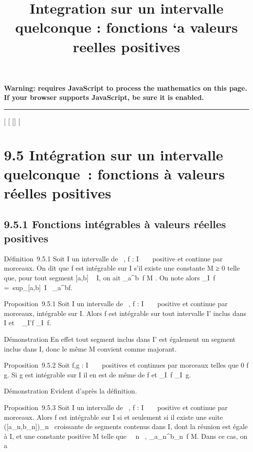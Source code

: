 \documentclass[]{article}
\title{Integration sur un intervalle quelconque : fonctions `a valeurs reelles
positives}
\author{}
\date{}
\begin{document}
\maketitle

\textbf{Warning: 
requires JavaScript to process the mathematics on this page.\\ If your
browser supports JavaScript, be sure it is enabled.}

\begin{center}\rule{3in}{0.4pt}\end{center}

[
[
[]
[

\section{9.5 Intégration sur un intervalle quelconque~: fonctions
à valeurs réelles positives}

\subsection{9.5.1 Fonctions intégrables à valeurs réelles positives}

Définition~9.5.1 Soit I un intervalle de ~, f : I \rightarrow~ ~ positive et
continue par morceaux. On dit que f est intégrable sur I s'il existe une
constante M ≥ 0 telle que, pour tout segment [a,b] \subset~ I, on ait
\int  _a^b~f \leq M . On note alors
\int  _I~f =\
sup_[a,b]\subset~I\int ~
_a^bf.

Proposition~9.5.1 Soit I un intervalle de ~, f : I \rightarrow~ ~ positive et
continue par morceaux, intégrable sur I. Alors f est intégrable sur tout
intervalle I' inclus dans I et \int ~
_I'f \leq\int  _I~f.

Démonstration En effet tout segment inclus dans I' est également un
segment inclus dans I, donc le même M convient comme majorant.

Proposition~9.5.2 Soit f,g : I \rightarrow~ ~ positives et continues par morceaux
telles que 0 \leq f \leq g. Si g est intégrable sur I il en est de même de f
et \int  _I~f
\leq\int  _I~g.

Démonstration Evident d'après la définition.

Proposition~9.5.3 Soit I un intervalle de ~, f : I \rightarrow~ ~ positive et
continue par morceaux. Alors f est intégrable sur I si et seulement si
il existe une suite ([a_n,b_n])_n\in\mathbb{N}~
croissante de segments contenus dans I, dont la réunion est égale à I,
et une constante positive M telle que \forall~~n \in \mathbb{N}~,
\int  _a_n^b_n~f
\leq M. Dans ce cas, on a
\end{document}

